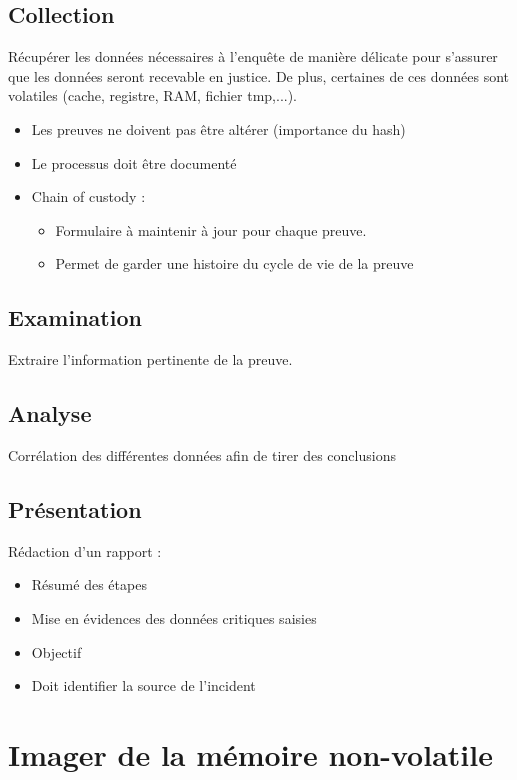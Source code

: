 \documentclass[a4paper]{article}
\begin{document}
\subsection{Collection}
Récupérer les données nécessaires à l'enquête de manière délicate pour s'assurer que les données seront recevable en justice. De plus, certaines de ces données sont volatiles (cache, registre, RAM, fichier tmp,...).
\begin{itemize}
    \item Les preuves ne doivent pas être altérer (importance du hash)
    \item Le processus doit être documenté
    \item Chain of custody :
    \begin{itemize}
        \item Formulaire à maintenir à jour pour chaque preuve.
        \item Permet de garder une histoire du cycle de vie de la preuve
    \end{itemize}
\end{itemize}

\subsection{Examination}
Extraire l'information pertinente de la preuve.

\subsection{Analyse}
Corrélation des différentes données afin de tirer des conclusions

\subsection{Présentation}
Rédaction d'un rapport :
\begin{itemize}
    \item Résumé des étapes
    \item Mise en évidences des données critiques saisies
    \item Objectif
    \item Doit identifier la source de l'incident
\end{itemize}
\newpage

\section{Imager de la mémoire non-volatile}
\end{document}
